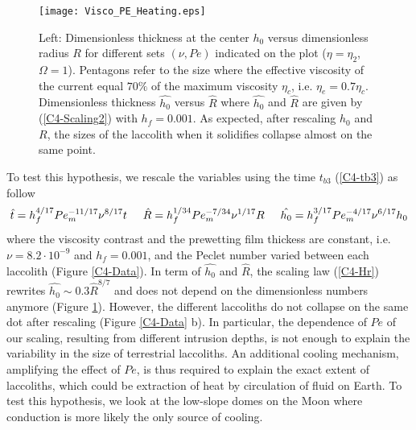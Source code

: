 \begin{figure}[h!]
  \begin{center}
    \graphicspath{ {/Users/thorey/Documents/These/Projet/Refroidissement/Skin_Model/Figure/Figure_Heating/} }
    \texttt{[image: Visco\_PE\_Heating.eps]}
    \caption{Left: Dimensionless thickness at  the center $h_0$ versus
      dimensionless radius $R$ for different sets $(\nu,Pe)$ indicated
      on the plot ($\eta=\eta_2$,  $\Omega=1$). Pentagons refer to the
      size where the  effective viscosity of the  current equal $70\%$
      of  the maximum  viscosity  $\eta_c$, i.e.   $\eta_e=0.7\eta_c$.
      Dimensionless  thickness  $\hat{h_0}$   versus  $\hat{R}$  where
      $\hat{h_0}$ and $\hat{R}$ are  given by (\ref{C4-Scaling2}) with
      $h_f=0.001$.  As  expected, after  rescaling $h_0$ and  $R$, the
      sizes of the laccolith when it solidifies collapse almost on the
      same point. }
    \label{C4-Visco_PE_Heating}
  \end{center}
\end{figure}


To  test this  hypothesis, we  rescale  the variables  using the  time
$t_{b3}$ (\ref{C4-tb3}) as follow
\begin{equation}
  \hat{t}=   h_f^{4/17}  Pe_m^{-11/17}\nu^{8/17}t      \hspace{.5cm}     \hat{R}=
  h_f^{1/34}Pe_m^{-7/34}\nu^{1/17}R\hspace{.5cm}                        \hat{h_0}=
  h_f^{3/17}Pe_m^{-4/17}\nu^{6/17}h_0
  \label{C4-Scaling2}
\end{equation}
where  the viscosity  contrast and  the prewetting  film thickess  are
constant,  i.e. $\nu  =  8.2\cdot 10^{-9}$  and  $h_f=0.001$, and  the
Peclet number  varied between  each laccolith  (Figure \ref{C4-Data}).
In term  of $\hat{h_0}$ and  $\hat{R}$, the scaling  law (\ref{C4-Hr})
rewrites $ \hat{h_0} \sim 0.3\hat{R}^{8/7}$ and does not depend on the
dimensionless            numbers            anymore            (Figure
\ref{C4-Visco_PE_Heating}). However,  the different laccoliths  do not
collapse on the same dot after rescaling (Figure \ref{C4-Data} b).  In
particular,  the dependence  of $Pe$  of our  scaling, resulting  from
different intrusion depths,  is not enough to  explain the variability
in  the  size  of   terrestrial  laccoliths.   An  additional  cooling
mechanism, amplifying the effect of  $Pe$, is thus required to explain
the exact extent  of laccoliths, which could be extraction  of heat by
circulation of fluid on Earth. To test this hypothesis, we look at the
low-slope domes on  the Moon where conduction is more  likely the only
source of cooling.

